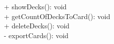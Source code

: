 { 
    + showDecks(): void \\ 
    + getCountOfDecksToCard(): void\\
    + deleteDecks(): void\\
    - exportCards(): void \\
}{}
